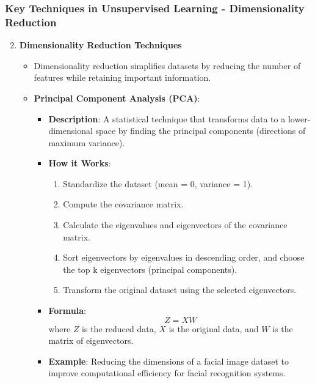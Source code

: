 \documentclass{beamer}
\begin{document}
\begin{frame}[fragile]
    \frametitle{Key Techniques in Unsupervised Learning - Dimensionality Reduction}
    \begin{enumerate}
        \setcounter{enumi}{1}  %
        \item \textbf{Dimensionality Reduction Techniques}
        
        \begin{itemize}
            \item Dimensionality reduction simplifies datasets by reducing the number of features while retaining important information.
            
            \item \textbf{Principal Component Analysis (PCA)}:
            \begin{itemize}
                \item \textbf{Description}: A statistical technique that transforms data to a lower-dimensional space by finding the principal components (directions of maximum variance).
                \item \textbf{How it Works}:
                \begin{enumerate}
                    \item Standardize the dataset (mean = 0, variance = 1).
                    \item Compute the covariance matrix.
                    \item Calculate the eigenvalues and eigenvectors of the covariance matrix.
                    \item Sort eigenvectors by eigenvalues in descending order, and choose the top k eigenvectors (principal components).
                    \item Transform the original dataset using the selected eigenvectors.
                \end{enumerate}
                \item \textbf{Formula}:
                \begin{equation}
                    Z = X W
                \end{equation}
                where \(Z\) is the reduced data, \(X\) is the original data, and \(W\) is the matrix of eigenvectors.
                \item \textbf{Example}: Reducing the dimensions of a facial image dataset to improve computational efficiency for facial recognition systems.
            \end{itemize}
        \end{itemize}
    \end{enumerate}
\end{frame}
\end{document}
